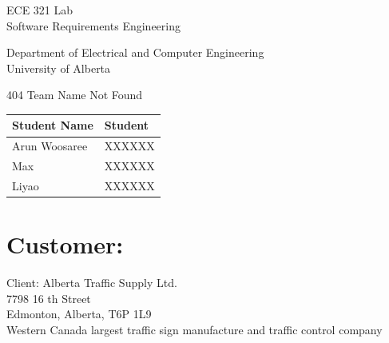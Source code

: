 \documentclass[letterpaper]{article}
\begin{document}
\begin{titlepage}
 \begin{center}

  \LARGE
  ECE 321 Lab\\ Software Requirements Engineering
  
  Department of Electrical and Computer Engineering\\
  
  University of Alberta
  
  \vspace{2cm}
  
  404 Team Name Not Found
  
  \vspace{5cm}
  \Large
  
  \begin{tabular}{ | m{5cm} | m{5cm} | }
   \hline
   Student Name  & Student \\
   \hline
   Arun Woosaree & XXXXXX  \\
   \hline
   Max           & XXXXXX  \\
   \hline
   Liyao         & XXXXXX  \\
   \hline
  \end{tabular}
  
  
  
  
 \end{center}
\end{titlepage}

\tableofcontents
\vfill
\newpage

\section{Customer:}
Client:
Alberta Traffic Supply Ltd.\\
7798 16 th Street\\
Edmonton, Alberta, T6P 1L9\\
Western Canada largest traffic sign manufacture and traffic control company\\
\end{document}
